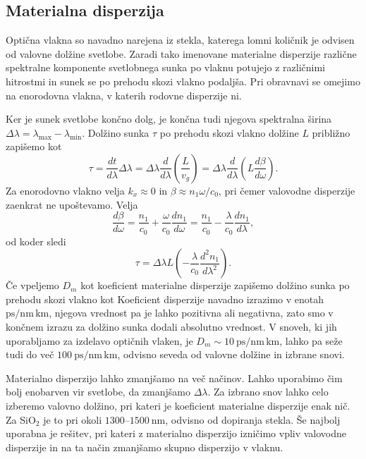 \subsection*{Materialna disperzija}
Optična vlakna so navadno narejena iz stekla, katerega lomni količnik je odvisen 
od valovne dolžine svetlobe. Zaradi tako imenovane materialne disperzije različne 
spektralne komponente svetlobnega sunka po vlaknu potujejo z različnimi hitrostmi 
in sunek se po prehodu skozi vlakno podaljša. Pri obravnavi 
se omejimo na enorodovna vlakna, v katerih rodovne disperzije ni. 

Ker je sunek svetlobe končno dolg, je končna tudi njegova spektralna širina 
$\Delta \lambda=\lambda_{\mathrm{max}}-\lambda_{\mathrm{min}}$. 
Dolžino sunka $\tau$ po prehodu skozi vlakno dolžine $L$ približno zapišemo kot
\begin{equation}
\tau = \frac{dt}{d\lambda}\Delta \lambda = \Delta \lambda \frac{d}{d\lambda}\left(\frac{L}{v_g}\right)
= \Delta \lambda \frac{d}{d\lambda}\left(L \frac{d\beta}{d\omega}\right).
\label{dispračun}
\end{equation}
Za enorodovno vlakno velja $k_x \approx 0$ in $\beta \approx n_1 \omega/c_0$, pri čemer
valovodne disperzije zaenkrat ne upoštevamo. Velja 
\begin{equation}
\frac{d\beta}{d\omega} = \frac{n_1}{c_0} + \frac{\omega}{c_0} \frac{d n_1}{d\omega} = \frac{n_1}{c_0} - 
\frac{\lambda}{c_0}\frac{dn_1}{d\lambda},
\end{equation}
od koder sledi 
\begin{equation}
\tau =\Delta \lambda L \left( - \frac{\lambda}{c_0}\frac{d^2n_1}{d\lambda^2}\right).
\end{equation}
Če vpeljemo $D_m$ kot koeficient materialne disperzije
zapišemo dolžino sunka po prehodu skozi vlakno kot 
Koeficient disperzije navadno izrazimo v enotah $\si{\pico\second/\nano\meter\, \kilo\meter}$, 
njegova vrednost pa je lahko pozitivna ali negativna, zato smo v končnem izrazu za dolžino 
sunka dodali absolutno vrednost. 
V snoveh, ki jih uporabljamo za izdelavo optičnih vlaken, je $D_m \sim  
10~\si{\pico\second/\nano\meter\, \kilo\meter}$, lahko pa seže
tudi do več $100~\si{\pico\second/\nano\meter\, \kilo\meter}$, odvisno seveda od valovne dolžine
in izbrane snovi. 

Materialno disperzijo lahko zmanjšamo na več načinov. Lahko uporabimo čim bolj enobarven
vir svetlobe, da zmanjšamo $\Delta \lambda$. Za izbrano snov lahko celo izberemo valovno 
dolžino, pri kateri je koeficient materialne disperzije enak nič. Za SiO$_2$ je to pri okoli $1300$--$1500~\si{\nano\meter}$, odvisno od dopiranja stekla. 
Še najbolj uporabna je rešitev, pri kateri 
z materialno disperzijo izničimo vpliv valovodne disperzije in na ta način zmanjšamo skupno 
disperzijo v vlaknu.


